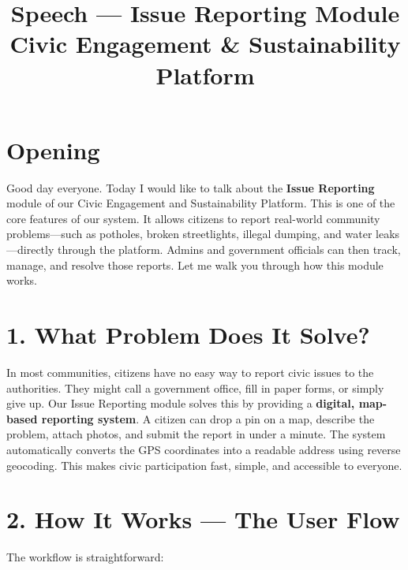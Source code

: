 \documentclass[12pt,a4paper]{article}
\title{\textbf{Speech --- Issue Reporting Module}\\[4pt]
\large Civic Engagement \& Sustainability Platform}
\author{}
\date{}
\begin{document}
\maketitle
\thispagestyle{empty}


\section*{Opening}

Good day everyone. Today I would like to talk about the \textbf{Issue Reporting} module of our Civic Engagement and Sustainability Platform. This is one of the core features of our system. It allows citizens to report real-world community problems---such as potholes, broken streetlights, illegal dumping, and water leaks---directly through the platform. Admins and government officials can then track, manage, and resolve those reports. Let me walk you through how this module works.

\section{1. What Problem Does It Solve?}

In most communities, citizens have no easy way to report civic issues to the authorities. They might call a government office, fill in paper forms, or simply give up. Our Issue Reporting module solves this by providing a \textbf{digital, map-based reporting system}. A citizen can drop a pin on a map, describe the problem, attach photos, and submit the report in under a minute. The system automatically converts the GPS coordinates into a readable address using reverse geocoding. This makes civic participation fast, simple, and accessible to everyone.

\section{2. How It Works --- The User Flow}

The workflow is straightforward:
\end{document}
